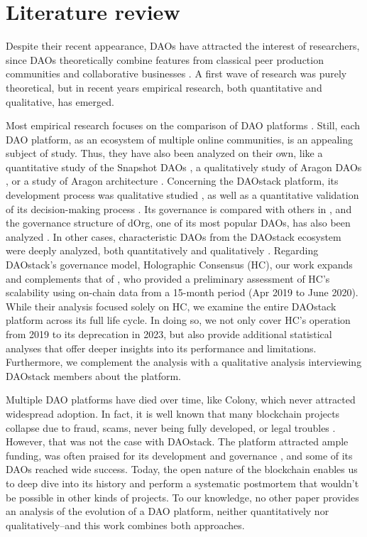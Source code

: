 \documentclass[10pt,lineno]{wlpeerj}
\begin{document}
\section{Literature review}

Despite their recent appearance, DAOs have attracted the interest of researchers, since DAOs theoretically combine features from classical peer production communities \cite{morell_governance_2014} and collaborative businesses \citep{scholz_ours_2016}. A first wave of research was purely theoretical, but in recent years empirical research, both quantitative and qualitative, has emerged. 

Most empirical research focuses on the comparison of DAO platforms \citep{el2020overview,faqir2021comparative,ma_demystifying_2024}. Still, each DAO platform, as an ecosystem of multiple online communities, is an appealing subject of study. Thus, they have also been analyzed on their own, like a quantitative study of the Snapshot DAOs \citep{wang2022empirical}, a qualitatively study of Aragon DAOs \citep{Pena_2023}, or a study of Aragon architecture \citep{dhillon2021decentralized}. 
Concerning the DAOstack platform, its development process was qualitative studied \citep{skarzauskiene2021developing}, as well as a quantitative validation of its decision-making process \citep{faqir-rhazoui_scalable_2021}. Its governance is compared with others in \citep{ding_voting_2023}, and the governance structure of dOrg, one of its most popular DAOs, has also been analyzed \citep{Mannan_2023}. In other cases, characteristic DAOs from the DAOstack ecosystem were deeply analyzed, both quantitatively and qualitatively  \citep{brekke2021dissensus,sharma2024unpacking,baninemeh2023decision}. 
Regarding DAOstack’s governance model, Holographic Consensus (HC), our work expands and complements that of \citep{faqir-rhazoui_scalable_2021}, who provided a preliminary assessment of HC’s scalability using on-chain data from a 15-month period (Apr 2019 to June 2020). While their analysis focused solely on HC, we examine the entire DAOstack platform across its full life cycle. In doing so, we not only cover HC’s operation from 2019 to its deprecation in 2023, but also provide additional statistical analyses that offer deeper insights into its performance and limitations. Furthermore, we complement the analysis with a qualitative analysis interviewing DAOstack members about the platform.

Multiple DAO platforms have died over time, like Colony, which never attracted widespread adoption. In fact, it is well known that many blockchain projects collapse due to fraud, scams, never being fully developed, or legal troubles \citep{white_web3_2024}. However, that was not the case with DAOstack. The platform attracted ample funding, was often praised for its development and governance \citep{guida_council_2022,noauthor_daos_2019,roy_10_2023,noauthor_ethereums_2020}, and some of its DAOs reached wide success. 
Today, the open nature of the blockchain enables us to deep dive into its history and perform a systematic postmortem that wouldn't be possible in other kinds of projects. To our knowledge, no other paper provides an analysis of the evolution of a DAO platform, neither quantitatively nor qualitatively--and this work combines both approaches. 
\end{document}
